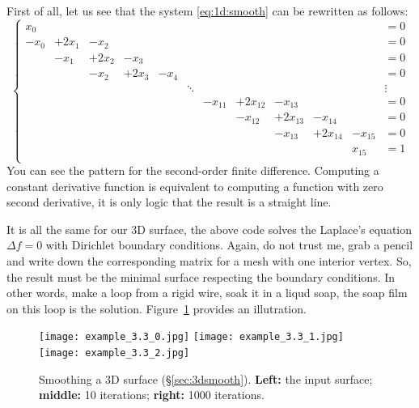 \documentclass[notitlepage,oneside]{book}
\begin{document}
First of all, let us see that the system \eqref{eq:1d:smooth} can be rewritten as follows:
\begin{equation}
\label{eq:1d:smooth-laplacian}
\left\{
\begin{array}{cccccccccccl}
 x_0 &       &       &       &      &        &         &          &          &          &         &= 0 \\
-x_0 & +2x_1 & -x_2  &       &      &        &         &          &          &          &         &= 0 \\
     & -x_1  & +2x_2 & -x_3  &      &        &         &          &          &          &         &= 0 \\
     &       & -x_2  & +2x_3 & -x_4 &        &         &          &          &          &         &= 0 \\
     &       &       &       &      & \ddots &         &          &          &          &         &  \vdots \\
     &       &       &       &      &        & -x_{11} & +2x_{12} & -x_{13}  &          &         &= 0 \\
     &       &       &       &      &        &         & -x_{12}  & +2x_{13} & -x_{14}  &         &= 0 \\
     &       &       &       &      &        &         &          & -x_{13}  & +2x_{14} & -x_{15} &= 0 \\
     &       &       &       &      &        &         &          &          &          &  x_{15} &= 1 \\
\end{array}
\right.
\end{equation}
You can see the pattern for the second-order finite difference.
Computing a constant derivative function is equivalent to computing a function with zero second derivative, it is only logic that the result is a straight line.

It is all the same for our 3D surface, the above code solves the Laplace's equation $\Delta f = 0$ with Dirichlet boundary conditions.
Again, do not trust me, grab a pencil and write down the corresponding matrix for a mesh with one interior vertex.
So, the result must be the minimal surface respecting the boundary conditions.
In other words, make a loop from a rigid wire, soak it in a liqud soap, the soap film on this loop is the solution.
Figure~\ref{fig:minsurface} provides an illutration.
\begin{figure}[ht]
    \centering
    \texttt{[image: example\_3.3\_0.jpg]}
    \texttt{[image: example\_3.3\_1.jpg]}
    \texttt{[image: example\_3.3\_2.jpg]}
    \caption{Smoothing a 3D surface (\S\ref{sec:3dsmooth}). \textbf{Left:} the input surface; \textbf{middle:} 10 iterations; \textbf{right:} 1000 iterations.}
    \label{fig:minsurface}
\end{figure}
\end{document}
